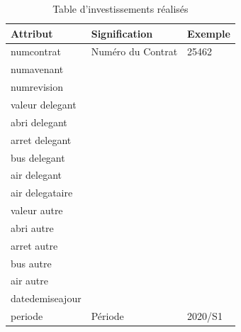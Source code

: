 \documentclass[a4paper]{report}
\begin{document}
\begin{doublespace}
	\begin{table}[H]
		\begin{center}
			\begin{tabularx}{17.5cm}{|X|p{3cm}|p{1.5cm}|}
				\hline
				\textbf{Attribut} & \textbf{Signification} & \textbf{Exemple} \\
				\hline
				numcontrat        & Numéro du Contrat      & 25462            \\
				\hline
				numavenant        &                        &                  \\
				\hline
				numrevision       &                        &                  \\
				\hline
				valeur delegant   &                        &                  \\
				\hline
				abri delegant     &                        &                  \\
				\hline
				arret delegant    &                        &                  \\
				\hline
				bus delegant      &                        &                  \\
				\hline
				air delegant      &                        &                  \\
				\hline
				air delegataire   &                        &                  \\
				\hline
				valeur autre      &                        &                  \\
				\hline
				abri autre        &                        &                  \\
				\hline
				arret autre       &                        &                  \\
				\hline
				bus autre         &                        &                  \\
				\hline
				air autre         &                        &                  \\
				\hline
				datedemiseajour   &                        &                  \\
				\hline
				periode           & Période                & 2020/S1          \\
				\hline
			\end{tabularx}
			\caption{Table d'investissements réalisés}
		\end{center}
	\end{table}


\end{doublespace}
\end{document}

